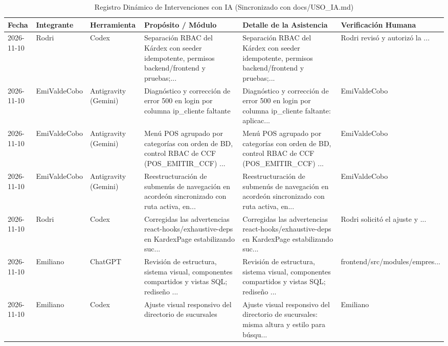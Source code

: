
\begin{table}[htbp]
\caption{Registro Dinámico de Intervenciones con IA (Sincronizado con docs/USO\_IA.md)}
\label{tab:registro_ia_dinamico}
\centering\scriptsize
\begin{tabularx}{\textwidth}{llllXX}
\toprule
\textbf{Fecha} & \textbf{Integrante} & \textbf{Herramienta} & \textbf{Propósito / Módulo} & \textbf{Detalle de la Asistencia} & \textbf{Verificación Humana} \\
\midrule
2026-11-10 & Rodri & Codex & Separación RBAC del Kárdex con seeder idempotente, permisos backend/frontend y pruebas;... & Separación RBAC del Kárdex con seeder idempotente, permisos backend/frontend y pruebas;... & Rodri revisó y autorizó la ... \\
2026-11-10 & EmiValdeCobo & Antigravity (Gemini) & Diagnóstico y corrección de error 500 en login por columna ip\_cliente faltante & Diagnóstico y corrección de error 500 en login por columna ip\_cliente faltante: aplicac... & EmiValdeCobo \\
2026-11-10 & EmiValdeCobo & Antigravity (Gemini) & Menú POS agrupado por categorías con orden de BD, control RBAC de CCF (POS\_EMITIR\_CCF) ... & Menú POS agrupado por categorías con orden de BD, control RBAC de CCF (POS\_EMITIR\_CCF) ... & EmiValdeCobo \\
2026-11-10 & EmiValdeCobo & Antigravity (Gemini) & Reestructuración de submenús de navegación en acordeón sincronizado con ruta activa, en... & Reestructuración de submenús de navegación en acordeón sincronizado con ruta activa, en... & EmiValdeCobo \\
2026-11-10 & Rodri & Codex & Corregidas las advertencias react-hooks/exhaustive-deps en KardexPage estabilizando suc... & Corregidas las advertencias react-hooks/exhaustive-deps en KardexPage estabilizando suc... & Rodri solicitó el ajuste y ... \\
2026-11-10 & Emiliano & ChatGPT & Revisión de estructura, sistema visual, componentes compartidos y vistas SQL; rediseño ... & Revisión de estructura, sistema visual, componentes compartidos y vistas SQL; rediseño ... & frontend/src/modules/empres... \\
2026-11-10 & Emiliano & Codex & Ajuste visual responsivo del directorio de sucursales & Ajuste visual responsivo del directorio de sucursales: misma altura y estilo para búsqu... & Emiliano \\

\end{tabularx}
\end{table}
